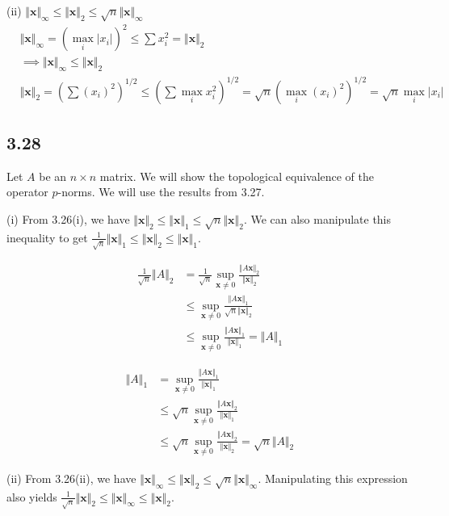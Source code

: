 \documentclass{article}
\begin{document}
	(ii) $\Vert \mathbf{x} \Vert_\infty \leq \Vert \mathbf{x} \Vert_2 \leq \sqrt{n} \Vert \mathbf{x} \Vert_\infty$
	\begin{align*}
	&\Vert \mathbf{x} \Vert_\infty = (\max_i |x_i|)^2 \leq \sum x_i^2 = \Vert \mathbf{x} \Vert_2 \\
	&\implies \Vert \mathbf{x} \Vert_\infty \leq \Vert \mathbf{x} \Vert_2  \\
	& \Vert \mathbf{x} \Vert_2 = (\sum(x_i)^2)^{1/2} \leq (\sum \max_i x_i^2)^{1/2} = \sqrt{n} (\max_i (x_i)^2)^{1/2}  = \sqrt{n} \max_i |x_i|
	\end{align*}
	
	\subsection*{3.28}
	Let $A$ be an $n \times n$ matrix. We will show the topological equivalence of the operator $p$-norms. We will use the results from 3.27.
	
	(i) From 3.26(i), we have $\Vert \mathbf{x} \Vert_2 \leq \Vert \mathbf{x} \Vert_1 \leq \sqrt{n} \Vert \mathbf{x} \Vert_2$. We can also manipulate this inequality to get $\frac{1}{\sqrt{n}} \Vert \mathbf{x} \Vert_1 \leq \Vert \mathbf{x} \Vert_2 \leq \Vert \mathbf{x} \Vert_1$.
	
	\begin{align*}
	\frac{1}{\sqrt{n}} \Vert A \Vert_2 &= \frac{1}{\sqrt{n}} \sup_{\mathbf{x} \neq 0} \frac{ \Vert A \mathbf{x} \Vert_2}{\Vert \mathbf{x} \Vert_2} \\
	&\leq \sup_{\mathbf{x} \neq 0} \frac{\Vert A \mathbf{x} \Vert_1}{\sqrt{n} \Vert \mathbf{x} \Vert_2} \\
	&\leq \sup_{\mathbf{x} \neq 0} \frac{\Vert A \mathbf{x} \Vert_1}{\Vert \mathbf{x} \Vert_1} = \Vert A \Vert_1
	\end{align*}
	
	\begin{align*}
	\Vert A \Vert_1 &= \sup_{\mathbf{x} \neq 0} \frac{\Vert A \mathbf{x} \Vert_1}{\Vert \mathbf{x} \Vert_1} \\
	&\leq \sqrt{n} \sup_{\mathbf{x} \neq 0} \frac{\Vert A \mathbf{x} \Vert_2}{\Vert \mathbf{x} \Vert_1} \\
	&\leq \sqrt{n} \sup_{\mathbf{x} \neq 0} \frac{\Vert A \mathbf{x} \Vert_2}{\Vert \mathbf{x} \Vert_2} = \sqrt{n} \Vert A \Vert_2
	\end{align*}
	
	(ii) From 3.26(ii), we have $\Vert \mathbf{x} \Vert_{\infty} \leq \Vert \mathbf{x} \Vert_2 \leq \sqrt{n} \Vert \mathbf{x} \Vert_\infty$. Manipulating this expression also yields $\frac{1}{\sqrt{n}} \Vert \mathbf{x} \Vert_2 \leq \Vert \mathbf{x} \Vert_{\infty} \leq \Vert \mathbf{x} \Vert_2$.
	
\end{document}
